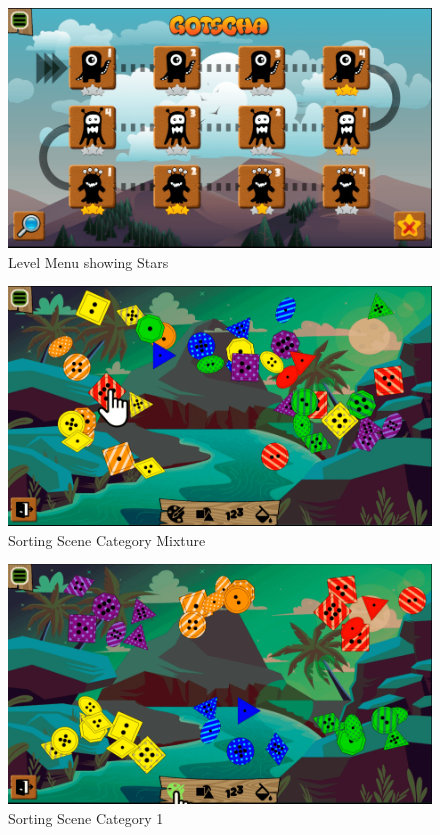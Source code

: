 \begin{figure}[H]
    \centering
    \includegraphics[width=1\textwidth]{figures/levelmenustars}
    \caption{Level Menu showing Stars}
    \label{fig:levelmenustars}
\end{figure}

\begin{figure}[H]
    \centering
    \includegraphics[width=1\textwidth]{figures/sortingscene1}
    \caption{Sorting Scene Category Mixture}
    \label{fig:sortingscene1}
\end{figure}

\begin{figure}[H]
    \centering
    \includegraphics[width=1\textwidth]{figures/sortingscene2}
    \caption{Sorting Scene Category 1}
    \label{fig:sortingscene2}
\end{figure}

